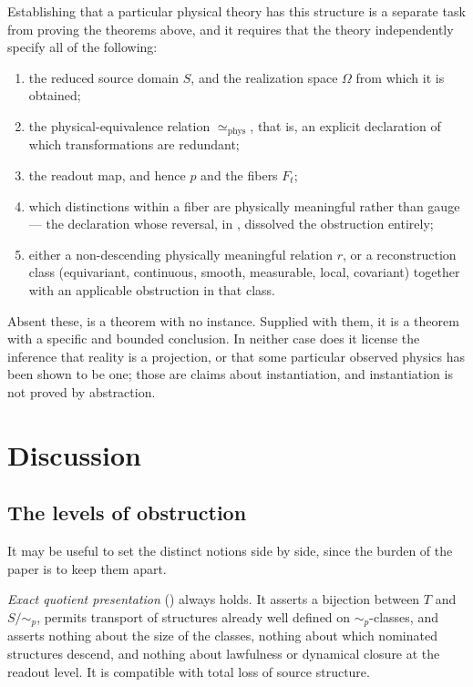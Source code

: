 \documentclass[11pt,reqno]{amsart}
\theoremstyle{plain}
\theoremstyle{definition}
\theoremstyle{remark}
\newcommand{\phe}{\simeq_{\mathrm{phys}}}
\newcommand{\Om}{\Omega}
\begin{document}
Establishing that a particular physical theory has this structure is a separate task from proving the theorems above, and it requires that the theory independently specify all of the following:
\begin{enumerate}
\item the reduced source domain $S$, and the realization space $\Om$ from which it is obtained;
\item the physical-equivalence relation $\phe$, that is, an explicit declaration of which transformations are redundant;
\item the readout map, and hence $p$ and the fibers $F_{t}$;
\item which distinctions within a fiber are physically meaningful rather than gauge --- the declaration whose reversal, in , dissolved the obstruction entirely;
\item either a non-descending physically meaningful relation $r$, or a reconstruction class (equivariant, continuous, smooth, measurable, local, covariant) together with an applicable obstruction in that class.
\end{enumerate}
Absent these,  is a theorem with no instance. Supplied with them, it is a theorem with a specific and bounded conclusion. In neither case does it license the inference that reality is a projection, or that some particular observed physics has been shown to be one; those are claims about instantiation, and instantiation is not proved by abstraction.

\section{Discussion}
\label{sec:discussion}

\subsection{The levels of obstruction}

It may be useful to set the distinct notions side by side, since the burden of the paper is to keep them apart.

\emph{Exact quotient presentation} () always holds. It asserts a bijection between $T$ and $S/\!\sim_{p}$, permits transport of structures already well defined on $\sim_{p}$-classes, and asserts nothing about the size of the classes, nothing about which nominated structures descend, and nothing about lawfulness or dynamical closure at the readout level. It is compatible with total loss of source structure.
\end{document}
